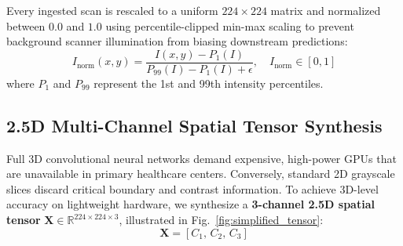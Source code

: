 \documentclass[conference]{IEEEtran}
\begin{document}
Every ingested scan is rescaled to a uniform $224 \times 224$ matrix and normalized between $0.0$ and $1.0$ using percentile-clipped min-max scaling to prevent background scanner illumination from biasing downstream predictions:
\begin{equation}
I_{\text{norm}}(x, y) = \frac{I(x, y) - P_{1}(I)}{P_{99}(I) - P_{1}(I) + \epsilon}, \quad I_{\text{norm}} \in [0, 1]
\end{equation}
where $P_1$ and $P_{99}$ represent the 1st and 99th intensity percentiles.

\subsection{2.5D Multi-Channel Spatial Tensor Synthesis}
Full 3D convolutional neural networks demand expensive, high-power GPUs that are unavailable in primary healthcare centers. Conversely, standard 2D grayscale slices discard critical boundary and contrast information. To achieve 3D-level accuracy on lightweight hardware, we synthesize a \textbf{3-channel 2.5D spatial tensor} $\mathbf{X} \in \mathbb{R}^{224 \times 224 \times 3}$, illustrated in Fig.~\ref{fig:simplified_tensor}:
\begin{equation}
\mathbf{X} = \left[ C_{1}, \, C_{2}, \, C_{3} \right]
\end{equation}
\end{document}
